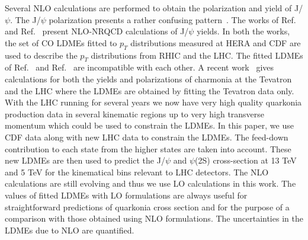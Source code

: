 \documentclass[12pt,a4paper,final]{iopart}
\begin{document}
  Several NLO calculations are performed to obtain the polarization and yield of
J/$\psi$. The J/$\psi$ polarization presents a rather confusing 
pattern~\cite{Butenschoen:2012px,Chao:2012iv,Gong:2012ug}.
  The works of Ref.~\cite{Butenschoen:2010rq} and  Ref.~\cite{Ma:2010yw} present
NLO-NRQCD calculations of J/$\psi$ yields.
  In both the works, the set of CO LDMEs fitted to $p_{T}$ distributions measured 
at HERA and CDF are used to describe the $p_{T}$ distributions from RHIC and 
the LHC.
 The fitted LDMEs of Ref.~\cite{Butenschoen:2010rq} and  Ref.~\cite{Ma:2010yw}
are incompatible with each other. A recent work~\cite{Shao:2014yta} gives 
calculations for both the yields and polarizations of charmonia at the Tevatron 
and the LHC where the LDMEs are obtained by fitting the Tevatron data only.
  With the LHC running for several years we now have very high quality quarkonia 
production data in several kinematic regions up to very high transverse momentum 
which could be used to constrain the LDMEs. In this paper, we use CDF data
\cite{Abe:1997yz,Abe:1997jz,Acosta:2004yw,Abulencia:2007bra} along with new LHC data 
\cite{Chatrchyan:2011kc,Khachatryan:2015rra,Chatrchyan:2012ub,Aad:2015duc,ATLAS:2014ala,
Aaij:2012ag,Aaij:2011jh,Aaij:2015rla,Aaij:2013dja} to constrain 
the LDMEs. 
 The feed-down contribution to each state from the higher states are taken into account.
These new LDMEs are then used to predict the J/$\psi$ and $\psi$(2S)
cross-section at 13 TeV and 5 TeV for the kinematical bins relevant to LHC detectors.
 The NLO calculations are still evolving and thus we use LO calculations in 
this work. The values of fitted LDMEs with LO formulations are always useful 
for straightforward predictions of quarkonia cross section and for the 
purpose of a comparison with those obtained using NLO formulations.
 The uncertainties in the LDMEs due to NLO are quantified. 
\end{document}
